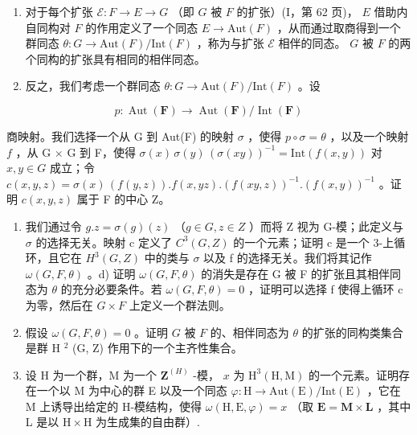 \begin{enumerate}
\def\labelenumi{\alph{enumi})}
\item
  对于每个扩张 \(\mathcal{E}: F \to E \to G\) （即 \(G\) 被 \(F\) 的扩张）(I，第 62 页)， \(E\) 借助内自同构对 \(F\) 的作用定义了一个同态 \(E \to \text{Aut}(F)\) ，从而通过取商得到一个群同态 \(\theta: G \to \text{Aut}(F)/\text{Int}(F)\) ，称为与扩张 \(\mathcal{E}\) 相伴的同态。 \(G\) 被 \(F\) 的两个同构的扩张具有相同的相伴同态。
\item
  反之，我们考虑一个群同态 \(\theta: G \to \text{Aut} (F)/\text{Int} (F)\) 。设
\end{enumerate}

\[
p: \operatorname{Aut} (\mathbf {F}) \rightarrow \operatorname{Aut} (\mathbf {F}) / \operatorname{Int} (\mathbf {F})
\]

商映射。我们选择一个从 G 到 Aut(F) 的映射 \(\sigma\) ，使得 \(p \circ \sigma = \theta\) ，以及一个映射 \(f\) ，从 G \(\times\) G 到 F，使得 \(\sigma(x)\, \sigma(y)\, (\sigma(xy))^{-1} = \text{Int}(f(x,y))\) 对 \(x,y \in G\) 成立；令 \(c(x,y,z) = \sigma(x)\, (f(y,z)).f(x,yz).(f(xy,z))^{-1}.(f(x,y))^{-1}\) 。证明 \(c(x,y,z)\) 属于 F 的中心 Z。

\begin{enumerate}
\def\labelenumi{\alph{enumi})}
\setcounter{enumi}{2}
\item
  我们通过令 \(g . z = \sigma(g) (z)\) （\(g \in G, z \in Z\) ）而将 Z 视为 G-模；此定义与 \(\sigma\) 的选择无关。映射 c 定义了 \(C^{3}(G, Z)\) 的一个元素；证明 c 是一个 3-上循环，且它在 \(H^{3}(G, Z)\) 中的类与 \(\sigma\) 以及 f 的选择无关。我们将其记作 \(\omega(G, F, \theta)\) 。d) 证明 \(\omega(G, F, \theta)\) 的消失是存在 G 被 F 的扩张且其相伴同态为 \(\theta\) 的充分必要条件。若 \(\omega(G, F, \theta) = 0\) ，证明可以选择 f 使得上循环 c 为零，然后在 \(G \times F\) 上定义一个群法则。
\item
  假设 \(\omega(G, F, \theta) = 0\) 。证明 \(G\) 被 \(F\) 的、相伴同态为 \(\theta\) 的扩张的同构类集合是群 H \(^{2}\) (G, Z) 作用下的一个主齐性集合。
\item
  设 H 为一个群，M 为一个 \(\mathbf{Z}^{(H)}\) -模， \(x\) 为 \(\mathrm{H}^3 (\mathrm{H},\mathrm{M})\) 的一个元素。证明存在一个以 M 为中心的群 E 以及一个同态 \(\varphi :\mathrm{H}\to \mathrm{Aut}(\mathrm{E}) / \mathrm{Int}(\mathrm{E})\) ，它在 M 上诱导出给定的 H-模结构，使得 \(\omega (\mathrm{H},\mathrm{E},\varphi) = x\) （取 \(\mathbf{E} = \mathbf{M}\times \mathbf{L}\) ，其中 L 是以 \(\mathrm{H}\times \mathrm{H}\) 为生成集的自由群）.
\end{enumerate}

